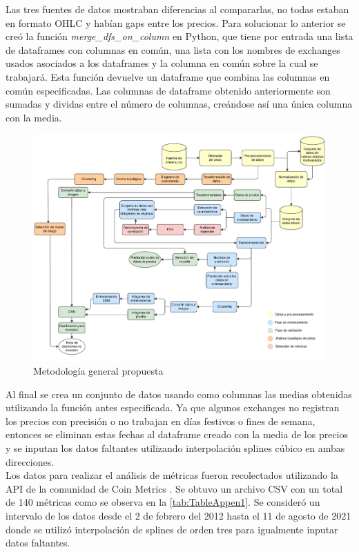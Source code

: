 Las tres fuentes de datos mostraban diferencias al compararlas, no todas estaban en formato OHLC y habían gaps entre los precios. Para solucionar lo anterior se creó la función \emph{merge\_dfs\_on\_column} en Python, que tiene por entrada una lista de dataframes con columnas en común, una lista con los nombres de exchanges usados asociados a los dataframes y la columna en común sobre la cual se trabajará. Esta función devuelve un dataframe que combina las columnas en común especificadas. Las columnas de dataframe obtenido anteriormente son sumadas y dividas entre el número de columnas, creándose así una única columna con la media.
\begin{landscape}
	\begin{figure}[h]
		\centering
		\includegraphics[scale=0.7]{Chapter3/Meto-2.pdf}
		\caption{Metodología general propuesta}
		\label{fig4}
	\end{figure}
\end{landscape}
Al final se crea un conjunto de datos usando como columnas las medias obtenidas utilizando la función antes especificada. Ya que algunos exchanges no registran los precios con precisión o no trabajan en días festivos o fines de semana, entonces se eliminan estas fechas al dataframe creado con la media de los precios y se inputan los datos faltantes utilizando interpolación splines cúbico en ambas direcciones.\\
Los datos para realizar el análisis de métricas fueron recolectados utilizando la API de la comunidad de Coin Metrics \cite{APIBasics}. Se obtuvo un archivo CSV con un total de 140 métricas como se observa en la \autoref{tab:TableAppen1}. Se consideró un intervalo de los datos desde el 2 de febrero del 2012 hasta el 11 de agosto de 2021 donde se utilizó interpolación de splines de orden tres para igualmente inputar datos faltantes.


